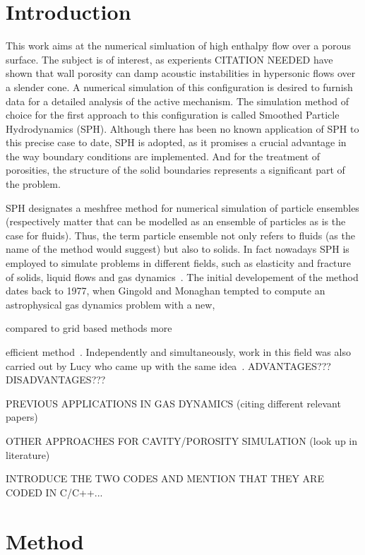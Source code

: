 \documentclass{report}
\begin{document}


\tableofcontents
\chapter{Introduction}
\label{sec:intro}


This work aims at the numerical simluation of high enthalpy flow over a porous
surface. The subject is of interest, as experients CITATION
NEEDED have shown that wall porosity can damp
acoustic instabilities in hypersonic flows over a slender cone. A numerical
simulation of this configuration is desired to furnish data for a detailed
analysis of the active mechanism. The simulation method of choice for the first approach
to this configuration is called Smoothed Particle Hydrodynamics (SPH). Although
there has been no known application of SPH to this precise case to date,
SPH is adopted, as it promises a crucial advantage in the way boundary
conditions are implemented. And for the treatment of porosities,
the structure of the solid boundaries represents a significant part of the problem.

SPH designates a meshfree method for numerical simulation of particle
ensembles (respectively matter that can be modelled as an ensemble of
particles as is the case for fluids).
Thus, the term particle ensemble not only refers
to fluids (as the name of the method would suggest) but also to solids. In
fact nowadays SPH is employed to simulate problems in different fields,
such as elasticity and fracture of solids, liquid flows and gas
dynamics~\cite{Monaghan2005}.
The initial developement of the method dates back to 1977, when Gingold and
Monaghan tempted to compute an astrophysical gas dynamics problem with a new,

 compared to grid based methods more

efficient method~\cite{Gingold1977}. Independently and simultaneously, work in
this field was also carried out by Lucy who came up with the same
idea~\cite{Lucy1977}.
ADVANTAGES???DISADVANTAGES???

PREVIOUS APPLICATIONS IN GAS DYNAMICS (citing different relevant papers)

OTHER APPROACHES FOR CAVITY/POROSITY SIMULATION (look up in literature)

INTRODUCE THE TWO CODES AND MENTION THAT THEY ARE CODED IN C/C++...



\chapter{Method}
\label{sec:method}
\end{document}
